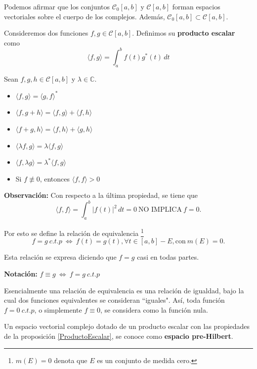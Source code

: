 Podemos afirmar que los conjuntos $\mathcal{C}_0 [a,b]$ y $\mathcal{C}[a,b]$ forman espacios vectoriales sobre el cuerpo de los complejos. Además, $\mathcal{C}_0 [a,b] \subset \mathcal{C} [a,b].$

\begin{defi}
Consideremos dos funciones $f,g \in \mathcal{C}[a,b]$. Definimos su \textbf{producto escalar} como
$$\boxed{\langle f , g \rangle = \int_a^b f(t) g^*(t) \,dt }$$
\end{defi}

\begin{propo} \label{ProductoEscalar}
 Sean $f,g,h \in \mathcal{C}[a,b]$ y  $\lambda \in \mathbb{C}$.
 
 \begin{itemize}
     \item $\langle f , g \rangle = \langle g, f \rangle^*$
     \item $\langle f , g + h \rangle = \langle f , g \rangle + \langle f , h \rangle$
     \item $\langle f + g , h \rangle = \langle f , h \rangle + \langle g , h \rangle$
     \item $\langle \lambda f , g \rangle = \lambda \langle f , g \rangle$
     \item $\langle  f , \lambda g \rangle = \lambda^*\langle f , g \rangle$
     \item Si $f \not\equiv 0$, entonces $\langle f , f \rangle > 0$
 \end{itemize}
\end{propo}

\textbf{Observación:} Con respecto a la última propiedad, se tiene que 
$$\langle f , f \rangle = \int_a^b |f(t)|^2 \,dt = 0 ~\mbox{NO IMPLICA}~ f = 0.$$

Por esto se define la relación de equivalencia \footnote{$m(E) = 0$ denota que $E$ es un conjunto de medida cero.}
$$f = g ~ c.t.p ~\Leftrightarrow~ f(t) = g(t), \forall t \in [a,b]-E, \mbox{con}~ m(E) = 0.$$

Esta relación se expresa diciendo que $f = g $ casi en todas partes.

\textbf{Notación:} $f \equiv g ~\Leftrightarrow~ f = g ~c.t.p$

Esencialmente una relación de equivalencia es una relación de igualdad, bajo la cual dos funciones equivalentes se consideran ``iguales". Así, toda función $f = 0 ~c.t.p$, o simplemente $f\equiv 0$, se considera como la función nula.

\begin{defi}
Un espacio vectorial complejo dotado de un producto escalar con las propiedades de la proposición \ref{ProductoEscalar}, se conoce como \textbf{espacio pre-Hilbert}.
\end{defi} 

